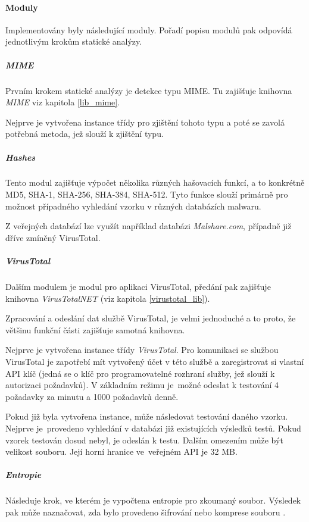 \paragraph*{Moduly}
\label{modules_app}

Implementovány byly následující moduly. Pořadí popisu modulů pak odpovídá jednotlivým krokům statické analýzy.

\subparagraph*{MIME} 

Prvním krokem statické analýzy je detekce typu MIME. Tu zajišťuje knihovna \emph{MIME} viz kapitola \ref{lib_mime}.

Nejprve je vytvořena instance třídy pro zjištění tohoto typu a poté se zavolá potřebná metoda, jež slouží k zjištění typu.
 
\subparagraph*{Hashes}

Tento modul zajišťuje výpočet několika různých hašovacích funkcí, a to konkrétně MD5, SHA-1, SHA-256, SHA-384, SHA-512.
Tyto funkce slouží primárně pro možnost případného vyhledání vzorku v různých databázích malwaru.

Z veřejných databází lze využít například databázi \emph{Malshare.com}, případně již dříve zmíněný VirusTotal.

\subparagraph*{VirusTotal}

Dalším modulem je modul pro aplikaci VirusTotal, předání pak zajišťuje knihovna \emph{VirusTotalNET} (viz kapitola \ref{virustotal_lib}).

Zpracování a odeslání dat službě VirusTotal, je velmi jednoduché a to proto, že většinu funkční části zajišťuje samotná knihovna. 

Nejprve je vytvořena instance třídy \emph{VirusTotal}. Pro komunikaci se službou VirusTotal je zapotřebí mít vytvořený účet v této službě a zaregistrovat si vlastní API klíč (jedná se o klíč pro programovatelné rozhraní služby, jež slouží k autorizaci požadavků). V základním režimu je~možné odeslat k testování 4 požadavky za minutu a 1000 požadavků denně.

Pokud již byla vytvořena instance, může následovat testování daného vzorku. Nejprve je~provedeno vyhledání v databázi již existujících výsledků testů. Pokud vzorek testován dosud nebyl, je odeslán k testu. Dalším omezením může být velikost souboru. Její horní hranice ve~veřejném API je 32 MB.

\subparagraph*{Entropie}

Následuje krok, ve kterém je vypočtena entropie pro zkoumaný soubor. Výsledek pak může naznačovat, zda bylo provedeno šifrování nebo komprese souboru \cite{sikorski2012practical}. 

